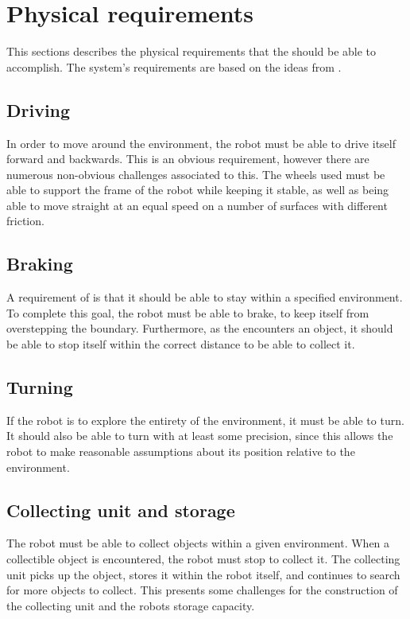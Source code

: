\section{Physical requirements} \label{sec:physical_requirements}
This sections describes the physical requirements that the \projname{} should be able to accomplish. The system's requirements are based on the ideas from . 

\subsection{Driving}
In order to move around the environment, the robot must be able to drive itself forward and backwards. This is an obvious requirement, however there are numerous non-obvious challenges associated to this. The wheels used must be able to support the frame of the robot while keeping it stable, as well as being able to move straight at an equal speed on a number of surfaces with different friction.

\subsection{Braking}
A requirement of \projname{} is that it should be able to stay within a specified environment. To complete this goal, the robot must be able to brake, to keep itself from overstepping the boundary. Furthermore, as the \projname{} encounters an object, it should be able to stop itself within the correct distance to be able to collect it.

\subsection{Turning}
If the robot is to explore the entirety of the environment, it must be able to turn. It should also be able to turn with at least some precision, since this allows the robot to make reasonable assumptions about its position relative to the environment. 

\subsection{Collecting unit and storage}
The robot must be able to collect objects within a given environment. When a collectible object is encountered, the robot must stop to collect it. The collecting unit picks up the object, stores it within the robot itself, and continues to search for more objects to collect. This presents some challenges for the construction of the collecting unit and the robots storage capacity.

